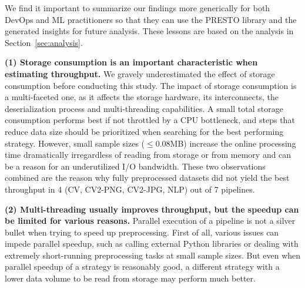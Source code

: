 



We find it important to summarize our findings more generically for both DevOps and ML practitioners so that they can use the PRESTO library and the generated insights for future analysis. These lessons are based on the analysis in Section~\ref{sec:analysis}.

\textbf{(1) Storage consumption is an important characteristic when estimating throughput. }
We gravely underestimated the effect of storage consumption before conducting this study.
The impact of storage consumption is a multi-faceted one, as it affects the storage hardware, its interconnects, the deserialization process and multi-threading capabilities.
{\color{diff2} 
A small total storage consumption performs best if not throttled by a CPU bottleneck, and steps that reduce data size should be prioritized when searching for the best performing strategy.
However, small sample sizes ($\leq 0.08$\:MB) increase the online processing time dramatically irregardless of reading from storage or from memory and can be a reason for an underutilized I/O bandwidth.
These two observations combined are the reason why fully preprocessed datasets did not yield the best throughput in 4 (CV, CV2-PNG, CV2-JPG, NLP) out of 7 pipelines.
}

{\color{diff2} 
\textbf{(2) Multi-threading usually improves throughput, but the speedup can be limited for various reasons. }}
Parallel execution of a pipeline is not a silver bullet when trying to speed up preprocessing.
{\color{diff2}
First of all, various issues can impede parallel speedup, such as calling external Python libraries or dealing with extremely short-running preprocessing tasks at small sample sizes.
But even when parallel speedup of a strategy is reasonably good, a different strategy with a lower data volume to be read from storage may perform much better.
}

